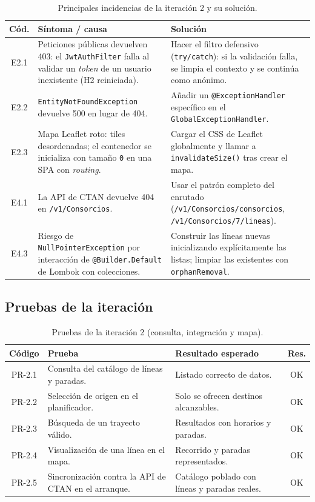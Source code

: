 \begin{table}[h!]
\centering
\small
\begin{tabular}{|c|p{5cm}|p{7cm}|}
\hline
\textbf{Cód.} & \textbf{Síntoma / causa} & \textbf{Solución} \\ \hline
E2.1 & Peticiones públicas devuelven 403: el \texttt{JwtAuthFilter} falla al validar un \textit{token} de un usuario inexistente (H2 reiniciada). & Hacer el filtro defensivo (\texttt{try/catch}): si la validación falla, se limpia el contexto y se continúa como anónimo. \\ \hline
E2.2 & \texttt{EntityNotFoundException} devuelve 500 en lugar de 404. & Añadir un \texttt{@ExceptionHandler} específico en el \texttt{GlobalExceptionHandler}. \\ \hline
E2.3 & Mapa Leaflet roto: tiles desordenadas; el contenedor se inicializa con tamaño \texttt{0} en una SPA con \textit{routing}. & Cargar el CSS de Leaflet globalmente y llamar a \texttt{invalidateSize()} tras crear el mapa. \\ \hline
E4.1 & La API de CTAN devuelve 404 en \texttt{/v1/Consorcios}. & Usar el patrón completo del enrutado (\texttt{/v1/Consorcios/consorcios}, \texttt{/v1/Consorcios/7/lineas}). \\ \hline
E4.3 & Riesgo de \texttt{NullPointerException} por interacción de \texttt{@Builder.Default} de Lombok con colecciones. & Construir las líneas nuevas inicializando explícitamente las listas; limpiar las existentes con \texttt{orphanRemoval}. \\ \hline
\end{tabular}
\caption{Principales incidencias de la iteración 2 y su solución.}
\label{tab:inc-it2}
\end{table}

\subsection{Pruebas de la iteración}

\begin{table}[h!]
\centering
\small
\begin{tabular}{|c|p{6.5cm}|p{5cm}|c|}
\hline
\textbf{Código} & \textbf{Prueba} & \textbf{Resultado esperado} & \textbf{Res.} \\ \hline
PR-2.1 & Consulta del catálogo de líneas y paradas. & Listado correcto de datos. & OK \\ \hline
PR-2.2 & Selección de origen en el planificador. & Solo se ofrecen destinos alcanzables. & OK \\ \hline
PR-2.3 & Búsqueda de un trayecto válido. & Resultados con horarios y paradas. & OK \\ \hline
PR-2.4 & Visualización de una línea en el mapa. & Recorrido y paradas representados. & OK \\ \hline
PR-2.5 & Sincronización contra la API de CTAN en el arranque. & Catálogo poblado con líneas y paradas reales. & OK \\ \hline
\end{tabular}
\caption{Pruebas de la iteración 2 (consulta, integración y mapa).}
\label{tab:pruebas-it2}
\end{table}


